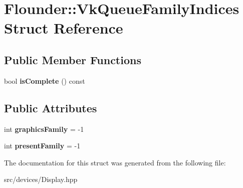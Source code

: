 \hypertarget{struct_flounder_1_1_vk_queue_family_indices}{}\section{Flounder\+:\+:Vk\+Queue\+Family\+Indices Struct Reference}
\label{struct_flounder_1_1_vk_queue_family_indices}
\subsection*{Public Member Functions}
\begin{DoxyCompactItemize}
\item 
\mbox{\label{struct_flounder_1_1_vk_queue_family_indices_a27b0a019bdd44316a91ebd2631e28fdb}} 
bool {\bfseries is\+Complete} () const
\end{DoxyCompactItemize}
\subsection*{Public Attributes}
\begin{DoxyCompactItemize}
\item 
\mbox{\label{struct_flounder_1_1_vk_queue_family_indices_ad8ea6add5c5cb1e4f0ce718ecd7da1aa}} 
int {\bfseries graphics\+Family} = -\/1
\item 
\mbox{\label{struct_flounder_1_1_vk_queue_family_indices_a254e1ecef1e52ee716a4d6e59fe43b5a}} 
int {\bfseries present\+Family} = -\/1
\end{DoxyCompactItemize}


The documentation for this struct was generated from the following file\+:\begin{DoxyCompactItemize}
\item 
src/devices/Display.\+hpp\end{DoxyCompactItemize}
